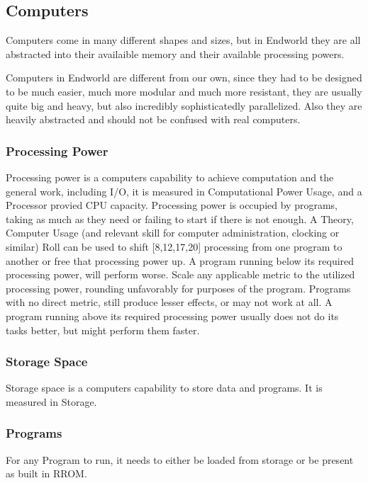 \subsection{Computers}\label{subsec:computers}
Computers come in many different shapes and sizes, but in Endworld they are all abstracted into
their availaible memory and their available processing powers.

Computers in Endworld are different from our own, since they had to be designed to be much easier, much more
modular and much more resistant, they are usually quite big and heavy, but also incredibly sophisticatedly
parallelized.
Also they are heavily abstracted and should not be confused with real computers.

\subsubsection{Processing Power}
Processing power is a computers capability to achieve computation and the general work, including I/O\@, it is measured
in Computational Power Usage, and a Processor provied CPU capacity.
Processing power is occupied by programs, taking as much as they need or failing to start if there is not enough.
A Theory, Computer Usage (and relevant skill for computer administration, clocking or similar) Roll can be used to shift 
[8,12,17,20] processing from one program to another or free that processing power up.
A program running below its required processing power, will perform worse.
Scale any applicable metric to the utilized processing power, rounding unfavorably for purposes of the program.
Programs with no direct metric, still produce lesser effects, or may not work at all.
A program running above its required processing power usually does not do its tasks better, but might perform them
faster.

\subsubsection{Storage Space}
Storage space is a computers capability to store data and programs.
It is measured in Storage.

\subsubsection{Programs}
For any Program to run, it needs to either be loaded from storage or be present as built in RROM\@.

